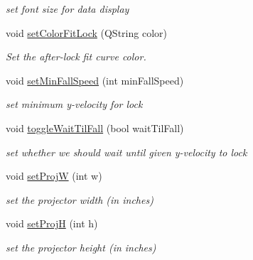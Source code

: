 \begin{DoxyCompactItemize}
\begin{DoxyCompactList}\small\item\em set font size for data display \end{DoxyCompactList}\item 
void \hyperlink{classProjectorWindow_a06c5d59ce16c5f7f06e715019bd02f51}{set\+Color\+Fit\+Lock} (Q\+String color)\hypertarget{classProjectorWindow_a06c5d59ce16c5f7f06e715019bd02f51}{}\label{classProjectorWindow_a06c5d59ce16c5f7f06e715019bd02f51}

\begin{DoxyCompactList}\small\item\em Set the after-\/lock fit curve color. \end{DoxyCompactList}\item 
void \hyperlink{classProjectorWindow_af693987a6561ee2fadda60c222b52167}{set\+Min\+Fall\+Speed} (int min\+Fall\+Speed)\hypertarget{classProjectorWindow_af693987a6561ee2fadda60c222b52167}{}\label{classProjectorWindow_af693987a6561ee2fadda60c222b52167}

\begin{DoxyCompactList}\small\item\em set minimum y-\/velocity for lock \end{DoxyCompactList}\item 
void \hyperlink{classProjectorWindow_a2fe471f6224ce92225b71b1432d1f77b}{toggle\+Wait\+Til\+Fall} (bool wait\+Til\+Fall)\hypertarget{classProjectorWindow_a2fe471f6224ce92225b71b1432d1f77b}{}\label{classProjectorWindow_a2fe471f6224ce92225b71b1432d1f77b}

\begin{DoxyCompactList}\small\item\em set whether we should wait until given y-\/velocity to lock \end{DoxyCompactList}\item 
void \hyperlink{classProjectorWindow_a4d17ef03cbd25259f62f1bcbad2ab1da}{set\+ProjW} (int w)\hypertarget{classProjectorWindow_a4d17ef03cbd25259f62f1bcbad2ab1da}{}\label{classProjectorWindow_a4d17ef03cbd25259f62f1bcbad2ab1da}

\begin{DoxyCompactList}\small\item\em set the projector width (in inches) \end{DoxyCompactList}\item 
void \hyperlink{classProjectorWindow_a744bcacfd4e1cf0f22ab01648590bc79}{set\+ProjH} (int h)\hypertarget{classProjectorWindow_a744bcacfd4e1cf0f22ab01648590bc79}{}\label{classProjectorWindow_a744bcacfd4e1cf0f22ab01648590bc79}

\begin{DoxyCompactList}\small\item\em set the projector height (in inches) \end{DoxyCompactList}\end{DoxyCompactItemize}
